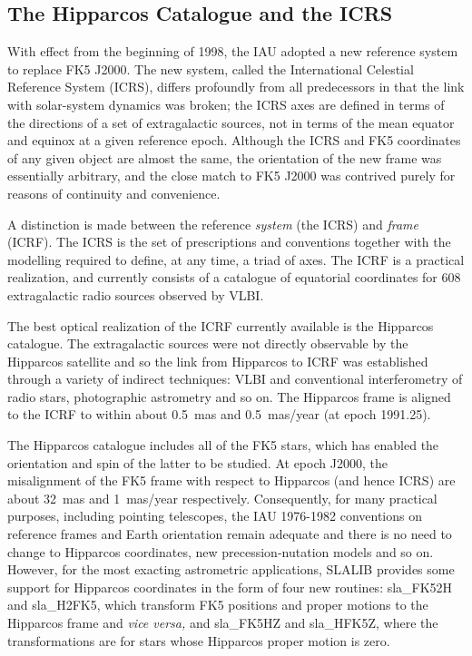 \documentclass[11pt,twoside]{article}
\begin{document}
\subsection{The Hipparcos Catalogue and the ICRS}
With effect from the beginning of 1998, the IAU adopted a new
reference system to replace FK5 J2000.  The new system, called the
International Celestial Reference System (ICRS), differs profoundly
from all predecessors in that the link with solar-system dynamics
was broken;  the ICRS axes are defined in terms of the directions
of a set of extragalactic sources, not in terms of the mean equator and
equinox at a given reference epoch.  Although the ICRS and FK5 coordinates
of any given object are almost the same, the orientation of the new frame
was essentially arbitrary, and the close match to FK5 J2000 was contrived
purely for reasons of continuity and convenience.

A distinction is made between the reference {\it system}\/ (the ICRS)
and {\it frame}\/ (ICRF).  The ICRS is the set of prescriptions and
conventions together with the modelling required to define, at any
time, a triad of axes.  The ICRF is a practical realization, and
currently consists of a catalogue of equatorial coordinates for 608
extragalactic radio sources observed by VLBI.

The best optical realization of the ICRF currently available is the
Hipparcos catalogue.  The extragalactic sources were not directly
observable by the Hipparcos satellite and so the link from Hipparcos
to ICRF was established through a variety of indirect techniques: VLBI and
conventional interferometry of radio stars, photographic astrometry
and so on.  The Hipparcos frame is aligned to the ICRF to within about
0.5~mas and 0.5~mas/year (at epoch 1991.25).

The Hipparcos catalogue includes all of the FK5 stars, which has enabled
the orientation and spin of the latter to be studied.  At epoch J2000,
the misalignment of the FK5 frame with respect to Hipparcos
(and hence ICRS) are about 32~mas and 1~mas/year respectively.
Consequently, for many practical purposes, including pointing
telescopes, the IAU 1976-1982 conventions on reference frames and
Earth orientation remain adequate and there is no need to change to
Hipparcos coordinates, new precession-nutation models and so on.
However, for the most exacting astrometric applications, SLALIB
provides some support for Hipparcos coordinates in the form of
four new routines:
sla\_FK52H and
sla\_H2FK5,
which transform FK5 positions and proper motions to the Hipparcos frame
and {\it vice versa,}\/ and
sla\_FK5HZ and
sla\_HFK5Z,
where the transformations are for stars whose Hipparcos proper motion is
zero.
\end{document}
